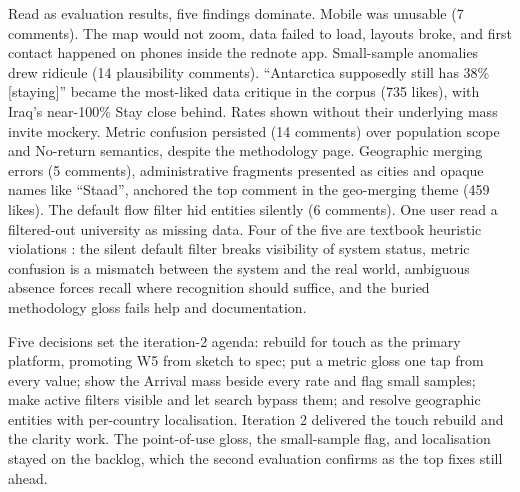 Read as evaluation results, five findings dominate. Mobile was unusable (7 comments). The map would not zoom, data failed to load, layouts broke, and first contact happened on phones inside the rednote app. Small-sample anomalies drew ridicule (14 plausibility comments). ``Antarctica supposedly still has 38\% [staying]'' became the most-liked data critique in the corpus (735 likes), with Iraq's near-100\% Stay close behind. Rates shown without their underlying mass invite mockery. Metric confusion persisted (14 comments) over population scope and No-return semantics, despite the methodology page. Geographic merging errors (5 comments), administrative fragments presented as cities and opaque names like ``Staad'', anchored the top comment in the geo-merging theme (459 likes). The default flow filter hid entities silently (6 comments). One user read a filtered-out university as missing data. Four of the five are textbook heuristic violations \cite{nielsen1990heuristic}: the silent default filter breaks visibility of system status, metric confusion is a mismatch between the system and the real world, ambiguous absence forces recall where recognition should suffice, and the buried methodology gloss fails help and documentation.

Five decisions set the iteration-2 agenda: rebuild for touch as the primary platform, promoting W5 from sketch to spec; put a metric gloss one tap from every value; show the Arrival mass beside every rate and flag small samples; make active filters visible and let search bypass them; and resolve geographic entities with per-country localisation. Iteration 2 delivered the touch rebuild and the clarity work. The point-of-use gloss, the small-sample flag, and localisation stayed on the backlog, which the second evaluation confirms as the top fixes still ahead.
